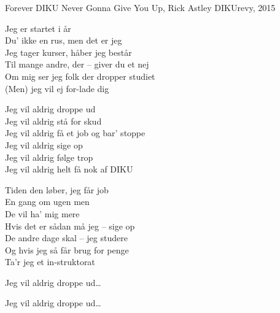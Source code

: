 \begin{song}{Forever DIKU}
  {} %
  {Never Gonna Give You Up, Rick Astley} %
  {} %
  {DIKUrevy, 2015} %
  {\NotCCLIed} %

  \begin{SBVerse}
    Jeg er startet i år\\
    Du' ikke en rus, men det er jeg\\
    Jeg tager kurser, håber jeg består\\
    Til mange andre, der -- giver du et nej\\
    Om mig ser jeg folk der dropper studiet\\
    (Men) jeg vil ej for-lade dig
  \end{SBVerse}

  \begin{SBChorus}
    Jeg vil aldrig droppe ud\\
    Jeg vil aldrig stå for skud\\
    Jeg vil aldrig få et job og bar' stoppe\\
    Jeg vil aldrig sige op\\
    Jeg vil aldrig følge trop\\
    Jeg vil aldrig helt få nok af DIKU
  \end{SBChorus}

  \begin{SBVerse}
    Tiden den løber, jeg får job\\
    En gang om ugen men\\
    De vil ha' mig mere\\
    Hvis det er sådan må jeg -- sige op\\
    De andre dage skal -- jeg studere\\
    Og hvis jeg så får brug for penge\\
    Ta'r jeg et in-struktorat
  \end{SBVerse}

  \begin{SBChorus}
      Jeg vil aldrig droppe ud\ldots
  \end{SBChorus}

  \begin{SBChorus}
      Jeg vil aldrig droppe ud\ldots
  \end{SBChorus}


\end{song}
